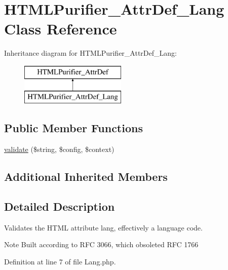 \hypertarget{classHTMLPurifier__AttrDef__Lang}{\section{H\+T\+M\+L\+Purifier\+\_\+\+Attr\+Def\+\_\+\+Lang Class Reference}
\label{classHTMLPurifier__AttrDef__Lang}
}
Inheritance diagram for H\+T\+M\+L\+Purifier\+\_\+\+Attr\+Def\+\_\+\+Lang\+:\begin{figure}[H]
\begin{center}
\leavevmode
\includegraphics[height=2.000000cm]{classHTMLPurifier__AttrDef__Lang}
\end{center}
\end{figure}
\subsection*{Public Member Functions}
\begin{DoxyCompactItemize}
\item 
\hyperlink{classHTMLPurifier__AttrDef__Lang_a6f17a3a8e59a27e9dea0bd9494ec158c}{validate} (\$string, \$config, \$context)
\end{DoxyCompactItemize}
\subsection*{Additional Inherited Members}


\subsection{Detailed Description}
Validates the H\+T\+M\+L attribute lang, effectively a language code. \begin{DoxyNote}{Note}
Built according to R\+F\+C 3066, which obsoleted R\+F\+C 1766 
\end{DoxyNote}


Definition at line 7 of file Lang.\+php.



